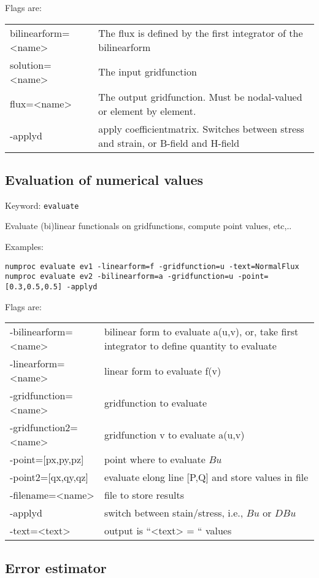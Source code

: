 \documentclass[12pt]{book}
\begin{document}
Flags are:
\begin{tabular}{ll}
\hline
bilinearform=<name> & The flux is defined by the first integrator of the bilinearform \\
solution=<name>  & The input gridfunction \\
flux=<name> & The output gridfunction. Must be nodal-valued or element by element.\\
-applyd     & apply coefficientmatrix. Switches between stress and strain, or
B-field and H-field \\
\hline
\end{tabular}


\subsection{Evaluation of numerical values}

Keyword: {\tt evaluate}

Evaluate (bi)linear functionals on gridfunctions, compute point values, etc,..

Examples:
\begin{verbatim}
numproc evaluate ev1 -linearform=f -gridfunction=u -text=NormalFlux
numproc evaluate ev2 -bilinearform=a -gridfunction=u -point=[0.3,0.5,0.5] -applyd
\end{verbatim}

Flags are:
\begin{tabular}{ll}
\hline
-bilinearform=<name> & bilinear form to evaluate a(u,v), or, take first
integrator to define quantity to evaluate \\
-linearform=<name>   & linear form to evaluate f(v) \\
-gridfunction=<name> & gridfunction to evaluate \\
-gridfunction2=<name> & gridfunction v to evaluate a(u,v) \\
-point=[px,py,pz] & point where to evaluate $B u$ \\
-point2=[qx,qy,qz] & evaluate elong line [P,Q] and store values in file \\
-filename=<name>   & file to store results \\
-applyd            & switch between stain/stress, i.e., $Bu$ or $DBu$ \\
-text=<text>       & output is ``<text> = `` values \\
\hline
\end{tabular}

\subsection{Error estimator}
\end{document}
